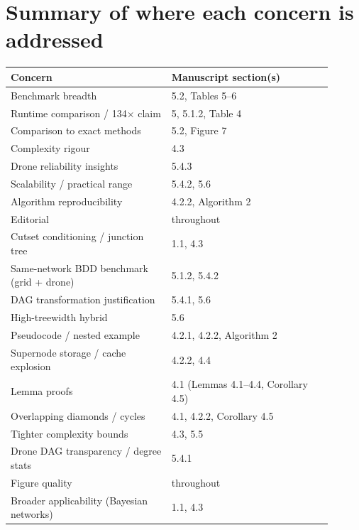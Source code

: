 \documentclass[11pt]{article}
\begin{document}
\section*{Summary of where each concern is addressed}

\begin{center}
\begin{tabular}{@{}p{0.45\linewidth}p{0.45\linewidth}@{}}
\toprule
\textbf{Concern} & \textbf{Manuscript section(s)} \\
\midrule
Benchmark breadth & 5.2, Tables 5--6 \\
Runtime comparison / 134$\times$ claim & 5, 5.1.2, Table 4 \\
Comparison to exact methods & 5.2, Figure 7 \\
Complexity rigour & 4.3 \\
Drone reliability insights & 5.4.3 \\
Scalability / practical range & 5.4.2, 5.6 \\
Algorithm reproducibility & 4.2.2, Algorithm 2 \\
Editorial & throughout \\
Cutset conditioning / junction tree & 1.1, 4.3 \\
Same-network BDD benchmark (grid + drone) & 5.1.2, 5.4.2 \\
DAG transformation justification & 5.4.1, 5.6 \\
High-treewidth hybrid & 5.6 \\
Pseudocode / nested example & 4.2.1, 4.2.2, Algorithm 2 \\
Supernode storage / cache explosion & 4.2.2, 4.4 \\
Lemma proofs & 4.1 (Lemmas 4.1--4.4, Corollary 4.5) \\
Overlapping diamonds / cycles & 4.1, 4.2.2, Corollary 4.5 \\
Tighter complexity bounds & 4.3, 5.5 \\
Drone DAG transparency / degree stats & 5.4.1 \\
Figure quality & throughout \\
Broader applicability (Bayesian networks) & 1.1, 4.3 \\
\bottomrule
\end{tabular}
\end{center}
\end{document}
